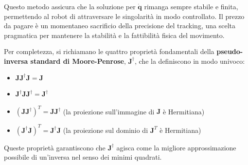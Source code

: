 ﻿\documentclass[11pt, a4paper]{article}
\begin{document}
Questo metodo assicura che la soluzione per \(\dot{\bm{q}}\) rimanga sempre stabile e finita, permettendo al robot di attraversare le singolarità in modo controllato. Il prezzo da pagare è un momentaneo sacrificio della precisione del tracking, una scelta pragmatica per mantenere la stabilità e la fattibilità fisica del movimento.

Per completezza, si richiamano le quattro proprietà fondamentali della \textbf{pseudo-inversa standard di Moore-Penrose}, \(\bm{J}^\dagger\), che la definiscono in modo univoco:
\begin{itemize}
    \item \(\bm{J}\bm{J}^\dagger\bm{J} = \bm{J}\)
    \item \(\bm{J}^\dagger\bm{J}\bm{J}^\dagger = \bm{J}^\dagger\)
    \item \((\bm{J}\bm{J}^\dagger)^T = \bm{J}\bm{J}^\dagger\) (la proiezione sull'immagine di \(\bm{J}\) è Hermitiana)
    \item \((\bm{J}^\dagger\bm{J})^T = \bm{J}^\dagger\bm{J}\) (la proiezione sul dominio di \(\bm{J}^T\) è Hermitiana)
\end{itemize}
Queste proprietà garantiscono che \(\bm{J}^\dagger\) agisca come la migliore approssimazione possibile di un'inversa nel senso dei minimi quadrati.

\newpage
\end{document}
